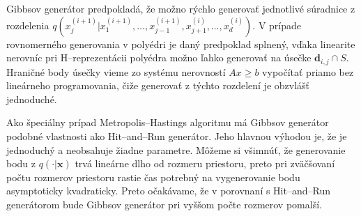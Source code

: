 Gibbsov generátor predpokladá, že možno rýchlo generovať jednotlivé súradnice z rozdelenia $q(x^{(i+1)}_j|x^{(i+1)}_1, \dots, x^{(i+1)}_{j-1}, x^{(i)}_{j+1}, \dots, x^{(i)}_d)$. V prípade rovnomerného generovania v polyédri je daný predpoklad splnený, vďaka linearite nerovníc pri H--reprezentácii polyédra možno ľahko generovať na úsečke $\mathbf d_{i,j} \cap S$. Hraničné body úsečky vieme zo systému nerovností $Ax \geq b$ vypočítať priamo bez lineárneho programovania, čiže generovať z týchto rozdelení je obzvlášť jednoduché.

Ako špeciálny prípad Metropolis--Hastings algoritmu má Gibbsov generátor podobné vlastnosti ako Hit--and--Run generátor. Jeho hlavnou výhodou je, že je jednoduchý a neobsahuje žiadne parametre. Môžeme si všimnúť, že generovanie bodu z $q(\cdot|\mathbf x)$ trvá lineárne dlho od rozmeru priestoru, preto pri zväčšovaní počtu rozmerov priestoru rastie čas potrebný na vygenerovanie bodu asymptoticky kvadraticky. Preto očakávame, že v porovnaní s Hit--and--Run generátorom bude Gibbsov generátor pri vyššom počte rozmerov pomalší.
